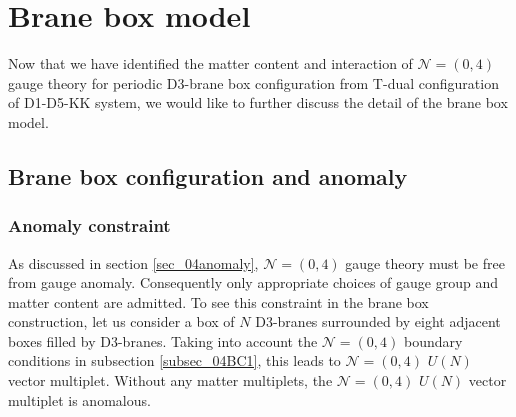 \documentclass{article}
\numberwithin{equation}{section}
\begin{document}
\section{Brane box model}
\label{sec_box}
Now that we have identified the matter content and interaction 
of $\mathcal{N}=(0,4)$ gauge theory for periodic D3-brane box configuration from T-dual configuration of D1-D5-KK system, 
we would like to further discuss the detail of the brane box model. 

\subsection{Brane box configuration and anomaly}
\label{sec_braneanomaly}




\subsubsection{Anomaly constraint}
\label{sec_NAanomaly}
As discussed in section \ref{sec_04anomaly}, $\mathcal{N}=(0,4)$ gauge theory must be free from gauge anomaly. 
Consequently only appropriate choices of gauge group and matter content are admitted. 
To see this constraint in the brane box construction, let us consider a box of $N$ D3-branes 
surrounded by eight adjacent boxes filled by D3-branes. 
Taking into account the $\mathcal{N}=(0,4)$ boundary conditions in subsection \ref{subsec_04BC1}, 
this leads to $\mathcal{N}=(0,4)$ $U(N)$ vector multiplet. 
Without any matter multiplets, the $\mathcal{N}=(0,4)$ $U(N)$ vector multiplet is anomalous. 
\end{document}
